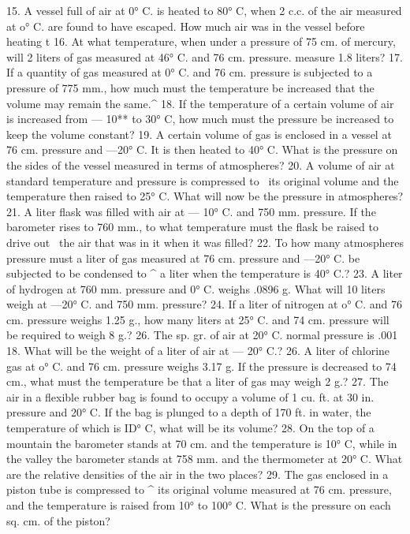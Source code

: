 15. A vessel full of air at 0° C. is heated to 80° C, when 2 c.c. of the air measured at o° C. are found to have escaped. How much air was in the vessel before heating t
16. At what temperature, when under a pressure of 75 cm. of mercury, will 2 liters of gas measured at 46° C. and 76 cm. pressure. measure 1.8 liters?
17. If a quantity of gas measured at 0° C. and 76 cm. pressure is subjected to a pressure of 775 mm., how much must the temperature be increased that the volume may remain the same.^
18. If the temperature of a certain volume of air is increased from — 10** to 30° C, how much must the pressure be increased to keep the volume constant?
19. A certain volume of gas is enclosed in a vessel at 76 cm. pressure and —20° C. It is then heated to 40° C. What is the pressure on the sides of the vessel measured in terms of atmospheres?
20. A volume of air at standard temperature and pressure is compressed to \ its original volume and the temperature then raised to 25° C. What will now be the pressure in atmospheres?
21. A liter flask was filled with air at — 10° C. and 750 mm. pressure. If the barometer rises to 760 mm., to what temperature must the flask be raised to drive out \ the air that was in it when it was filled?
22. To how many atmospheres pressure must a liter of gas measured at 76 cm. pressure and —20° C. be subjected to be condensed to ^ a liter when the temperature is 40° C.?
23. A liter of hydrogen at 760 mm. pressure and 0° C. weighs .0896 g. What will 10 liters weigh at —20° C. and 750 mm. pressure?
24. If a liter of nitrogen at o° C. and 76 cm. pressure weighs 1.25 g., how many liters at 25° C. and 74 cm. pressure will be required to weigh 8 g.?
26. The sp. gr. of air at 20° C. normal pressure is .001 18. What will be the weight of a liter of air at — 20° C.?
26. A liter of chlorine gas at o° C. and 76 cm. pressure weighs 3.17 g. If the pressure is decreased to 74 cm., what must the temperature be that a liter of gas may weigh 2 g.?
27. The air in a flexible rubber bag is found to occupy a volume of 1 cu. ft. at 30 in. pressure and 20° C. If the bag is plunged to a depth of 170 ft. in water, the temperature of which is ID° C, what will be its volume?
28. On the top of a mountain the barometer stands at 70 cm. and the temperature is 10° C, while in the valley the barometer stands at 758 mm. and the thermometer at 20° C. What are the relative densities of the air in the two places?
29. The gas enclosed in a piston tube is compressed to ^ its original volume measured at 76 cm. pressure, and the temperature is raised from 10° to 100° C. What is the pressure on each sq. cm. of the piston?
